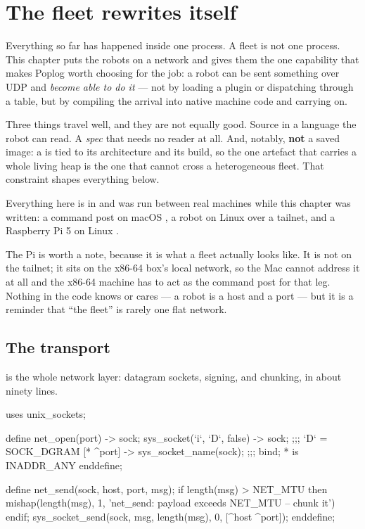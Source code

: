 \chapter{The fleet rewrites itself}

Everything so far has happened inside one process. A fleet is not one
process. This chapter puts the robots on a network and gives them the one
capability that makes Poplog worth choosing for the job: a robot can be sent
something over UDP and \emph{become able to do it} --- not by loading a
plugin or dispatching through a table, but by compiling the arrival into
native machine code and carrying on.

Three things travel well, and they are not equally good. Source in a
language the robot can read. A \emph{spec} that needs no reader at all. And,
notably, \textbf{not} a saved image: a  is tied to its
architecture and its build, so the one artefact that carries a whole living
heap is the one that cannot cross a heterogeneous fleet. That constraint
shapes everything below.

Everything here is in \href{\ghbase}{} and was run
between real machines while this chapter was written: a command post on
macOS , a robot on Linux  over a tailnet, and a
Raspberry Pi 5 on Linux .

The Pi is worth a note, because it is what a fleet actually looks like. It
is not on the tailnet; it sits on the x86-64 box's local network, so the Mac
cannot address it at all and the x86-64 machine has to act as the command
post for that leg. Nothing in the code knows or cares --- a robot is a host
and a port --- but it is a reminder that ``the fleet'' is rarely one flat
network.

\section{The transport}

 is the whole network layer: datagram sockets, signing,
and chunking, in about ninety lines.

\begin{pop}
uses unix_sockets;

define net_open(port) -> sock;
    sys_socket(`i`, `D`, false) -> sock;        ;;; `D` = SOCK_DGRAM
    [* ^port] -> sys_socket_name(sock);         ;;; bind; * is INADDR_ANY
enddefine;

define net_send(sock, host, port, msg);
    if length(msg) > NET_MTU then
        mishap(length(msg), 1, 'net_send: payload exceeds NET_MTU -- chunk it')
    endif;
    sys_socket_send(sock, msg, length(msg), 0, [^host ^port]);
enddefine;
\end{pop}

